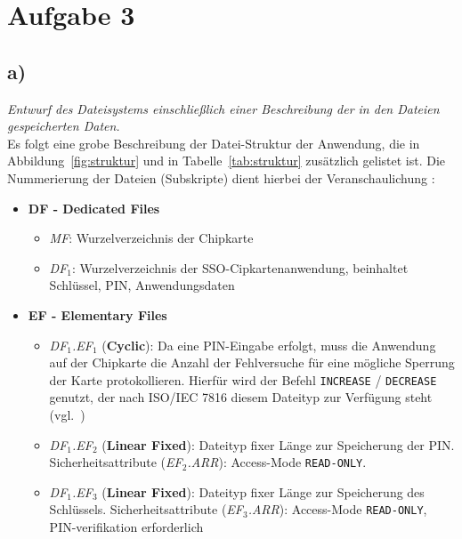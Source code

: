 \chapter{Aufgabe 3}

\section{a)}

\textit{Entwurf des Dateisystems einschließlich einer Beschreibung der in den Dateien
gespeicherten Daten.}\\

\noindent
Es folgt eine grobe Beschreibung der Datei-Struktur der Anwendung, die in Abbildung~\ref{fig:struktur} und in Tabelle~\ref{tab:struktur} zusätzlich gelistet ist.
Die Nummerierung der Dateien (Subskripte) dient hierbei der Veranschaulichung :

\begin{itemize}
    \itemsep0.5em
    \item \textbf{DF - Dedicated Files}
    \begin{itemize}
        \item \textit{MF}: Wurzelverzeichnis der Chipkarte
        \item \textit{DF$_1$}: Wurzelverzeichnis der SSO-Cipkartenanwendung, beinhaltet Schlüssel, PIN, Anwendungsdaten
    \end{itemize}
    \item \textbf{EF - Elementary Files}
    \begin{itemize}
    \item \textit{DF$_1$.EF$_1$} (\textbf{Cyclic}): Da eine PIN-Eingabe erfolgt, muss die Anwendung auf der Chipkarte die Anzahl der Fehlversuche
    für eine mögliche Sperrung der Karte protokollieren.
    Hierfür wird der Befehl \texttt{INCREASE} / \texttt{DECREASE} genutzt,
    der nach ISO/IEC 7816 diesem Dateityp zur Verfügung steht (vgl.~\cite[45]{ITS5})
    \item \textit{DF$_1$.EF$_2$} (\textbf{Linear Fixed}): Dateityp fixer Länge zur Speicherung der PIN.
    Sicherheitsattribute (\textit{EF$_2$.ARR}): Access-Mode \texttt{READ-ONLY}.
    \item  \textit{DF$_1$.EF$_3$} (\textbf{Linear Fixed}): Dateityp fixer Länge zur Speicherung des Schlüssels.
    Sicherheitsattribute (\textit{EF$_3$.ARR}): Access-Mode \texttt{READ-ONLY}, PIN-verifikation erforderlich
    \end{itemize}
\end{itemize}

